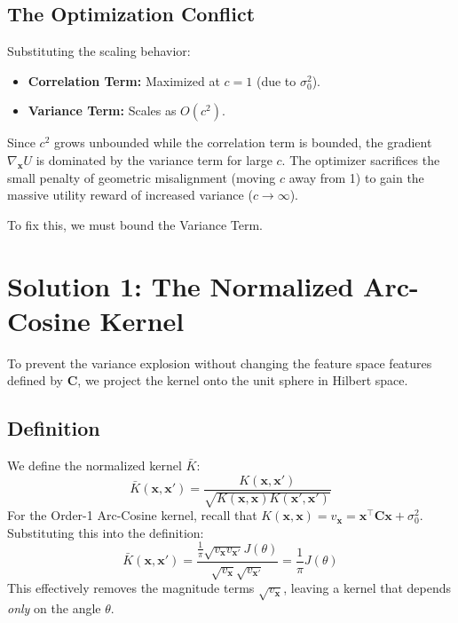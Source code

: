 \documentclass[11pt]{article}
\newcommand{\bx}{\mathbf{x}}
\newcommand{\bC}{\mathbf{C}}
\begin{document}
\subsection{The Optimization Conflict}
Substituting the scaling behavior:
\begin{itemize}
    \item \textbf{Correlation Term:} Maximized at $c=1$ (due to $\sigma_0^2$).
    \item \textbf{Variance Term:} Scales as $O(c^2)$.
\end{itemize}
Since $c^2$ grows unbounded while the correlation term is bounded, the gradient $\nabla_{\bx} U$ is dominated by the variance term for large $c$. The optimizer sacrifices the small penalty of geometric misalignment (moving $c$ away from 1) to gain the massive utility reward of increased variance ($c \to \infty$).

To fix this, we must bound the Variance Term.

\section{Solution 1: The Normalized Arc-Cosine Kernel}

To prevent the variance explosion without changing the feature space features defined by $\bC$, we project the kernel onto the unit sphere in Hilbert space.

\subsection{Definition}
We define the normalized kernel $\bar{K}$:
\begin{equation}
    \bar{K}(\bx, \bx') = \frac{K(\bx, \bx')}{\sqrt{K(\bx, \bx) K(\bx', \bx')}}
\end{equation}
For the Order-1 Arc-Cosine kernel, recall that $K(\bx, \bx) = v_{\bx} = \bx^\top \bC \bx + \sigma_0^2$. Substituting this into the definition:
\begin{equation}
    \bar{K}(\bx, \bx') = \frac{\frac{1}{\pi} \sqrt{v_{\bx} v_{\bx'}} J(\theta)}{\sqrt{v_{\bx}} \sqrt{v_{\bx'}}} = \frac{1}{\pi} J(\theta)
\end{equation}
This effectively removes the magnitude terms $\sqrt{v_{\bx}}$, leaving a kernel that depends \emph{only} on the angle $\theta$.
\end{document}
